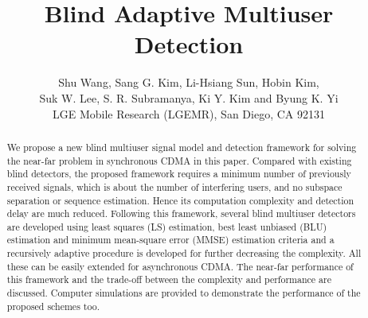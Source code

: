 \documentclass[a4paper,10pt,fleqn, twocolumn]{IEEETran}
\title{Blind Adaptive Multiuser Detection}
\author{Shu Wang, Sang G. Kim, Li-Hsiang Sun, Hobin Kim,\\Suk W. Lee, S. R. Subramanya, Ki Y. Kim and Byung K. Yi\\ LGE
Mobile Research (LGEMR), San Diego, CA 92131}
\date{}
\begin{document}
\maketitle
\begin{abstract}\small
We propose a new blind multiuser signal model and detection
framework for solving the near-far problem in synchronous CDMA in
this paper. Compared with existing blind detectors, the proposed
framework requires a minimum number of previously received
signals, which is about the number of interfering users, and no
subspace separation or sequence estimation. Hence its computation
complexity and detection delay are much reduced. Following this
framework, several blind multiuser detectors are developed using
least squares (LS) estimation, best least unbiased (BLU)
estimation and minimum mean-square error (MMSE) estimation
criteria and a recursively adaptive procedure is developed for
further decreasing the complexity. All these can be easily
extended for asynchronous CDMA. The near-far performance of this
framework and the trade-off between the complexity and performance
are discussed. Computer simulations are provided to demonstrate
the performance of the proposed schemes too.
\end{abstract}
\end{document}
